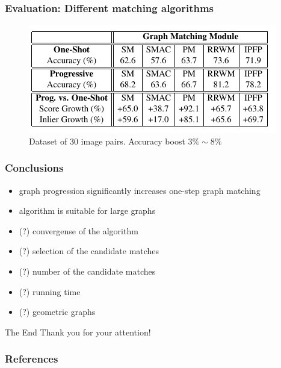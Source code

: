 \documentclass[hyperref={pdfpagelabels=false}]{beamer}
\begin{document}
\begin{frame}
 \frametitle{Evaluation: Different matching algorithms}
 \begin{figure}
  \includegraphics[scale=0.8]{fig_table1.png}
  \caption{Dataset of $30$ image pairs. Accuracy boost $3\%\sim 8\%$}
 \end{figure}

\end{frame}


\begin{frame}
 \frametitle{Conclusions}
 \begin{itemize}
  \item graph progression significantly increases one-step graph matching
  \item algorithm is suitable for large graphs
  \vspace{30pt}
  
  \item (?) convergense of the algorithm
  \item (?) selection of the candidate matches
  \item (?) number of the candidate matches
  \item (?) running time
  \item (?) geometric graphs
 \end{itemize}

\end{frame}

\begin{frame}{The End}
\centering
\LARGE
\color{red}
 Thank you for your attention!
 
 \nocite{MinsuChoSubb}
\end{frame}

\begin{frame} [allowframebreaks]
	\frametitle{References}
	
	
\end{frame} 
\end{document}
